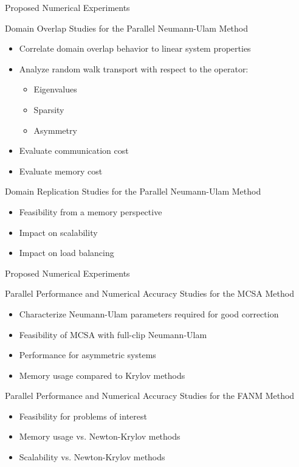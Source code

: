 \documentclass{beamer}
\begin{document}
\begin{frame}{Proposed Numerical Experiments}

  \pause
  Domain Overlap Studies for the Parallel Neumann-Ulam Method
  \begin{itemize}
  \item Correlate domain overlap behavior to linear system properties
  \item Analyze random walk transport with respect to the operator:
    \begin{itemize}
    \item Eigenvalues
    \item Sparsity
    \item Asymmetry
    \end{itemize}
  \item Evaluate communication cost
  \item Evaluate memory cost
  \end{itemize}

  \pause
  Domain Replication Studies for the Parallel Neumann-Ulam Method
  \begin{itemize}
  \item Feasibility from a memory perspective
  \item Impact on scalability
  \item Impact on load balancing
  \end{itemize}

\end{frame}

\begin{frame}{Proposed Numerical Experiments}

  Parallel Performance and Numerical Accuracy Studies for the MCSA
  Method
  \begin{itemize}
  \item Characterize Neumann-Ulam parameters required for good
    correction
  \item Feasibility of MCSA with full-clip Neumann-Ulam
  \item Performance for asymmetric systems
  \item Memory usage compared to Krylov methods
  \end{itemize}

  \pause
  Parallel Performance and Numerical Accuracy Studies for the FANM
  Method
  \begin{itemize}
  \item Feasibility for problems of interest
  \item Memory usage vs. Newton-Krylov methods
  \item Scalability vs. Newton-Krylov methods
  \end{itemize}

\end{frame}
\end{document}
